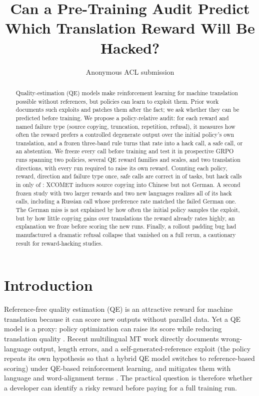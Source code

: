 \documentclass[11pt]{article}
\title{Can a Pre-Training Audit Predict Which Translation Reward Will Be Hacked?}
\author{Anonymous ACL submission}
\begin{document}
\maketitle

\begin{abstract}
Quality-estimation (QE) models make reinforcement learning for machine
translation possible without references, but policies can learn to exploit
them.  Prior work documents such exploits and patches them after the fact; we
ask whether they can be predicted before training.  We propose a
policy-relative audit: for each reward and named failure type (source copying,
truncation, repetition, refusal), it measures how often the reward prefers a
controlled degenerate output over the initial policy's own translation, and a
frozen three-band rule turns that rate into a hack call, a safe call, or an
abstention.  We freeze every call before training and test it in
\ScaleRuns{} prospective GRPO runs spanning two policies, several QE reward
families and scales, and two translation directions, with every run required
to raise its own reward.  Counting each policy, reward, direction and failure
type once, safe calls are correct in \TaskSafeAllCorrect{} of \TaskSafeTasks{}
tasks, but hack calls in only \TaskHackAllCorrect{} of \TaskHackTasks{}: XCOMET
induces source copying into Chinese but not German.  A second frozen study with
two larger rewards and two new languages realizes all \GenHackTasks{} of its
hack calls, including a Russian call whose preference rate matched the failed
German one.  The German miss is not explained by how often the initial policy
samples the exploit, but by how little copying gains over translations the
reward already rates highly, an explanation we froze before scoring the new
runs.  Finally, a rollout padding bug had manufactured a dramatic refusal
collapse that vanished on a full rerun, a cautionary result for reward-hacking
studies.
\end{abstract}

\section{Introduction}

Reference-free quality estimation (QE) is an attractive reward for machine
translation because it can score new outputs without parallel data.  Yet a QE
model is a proxy: policy optimization can raise its score while reducing
translation quality \citep{he-etal-2024-improving}.  Recent multilingual MT
work directly documents wrong-language output, length errors, and a
self-generated-reference exploit (the policy repeats its own hypothesis so that
a hybrid QE model switches to reference-based scoring) under QE-based
reinforcement learning, and mitigates them with language and word-alignment
terms \citep{liu-etal-2026-mending}.  The practical question is therefore whether a
developer can identify a risky reward before paying for a full training run.
\end{document}
